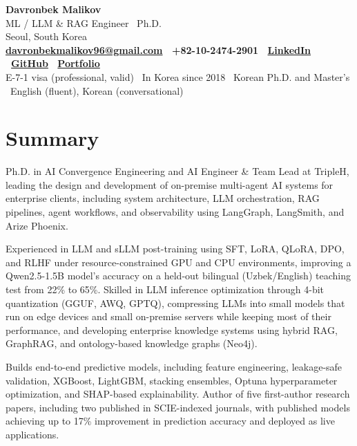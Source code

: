 \documentclass[10pt,a4paper]{article}
\newcommand{\name}[1]{{\Huge\bfseries #1}}
\begin{document}
\begin{center}
\name{Davronbek Malikov} \\[1.5mm]
ML / LLM \& RAG Engineer \textbar\ Ph.D. \\
Seoul, South Korea \\[0.5mm]
\textbf{
  \href{mailto:davronbekmalikov96@gmail.com}{davronbekmalikov96@gmail.com}
  \textbar\ +82-10-2474-2901
  \textbar\ \href{https://www.linkedin.com/in/davronbek-malikov}{LinkedIn}
  \textbar\ \href{https://github.com/davronbek-malikov}{GitHub}
  \textbar\ \href{https://davronbek-portfolio.vercel.app}{Portfolio}
} \\[0.5mm]
{\small E-7-1 visa (professional, valid) \textbar\ In Korea since 2018 \textbar\ Korean Ph.D. and Master's \textbar\ English (fluent), Korean (conversational)}
\end{center}

\section*{Summary}
Ph.D. in AI Convergence Engineering and AI Engineer \& Team Lead at TripleH, leading the design and development of
on-premise multi-agent AI systems for enterprise clients, including system architecture, LLM orchestration, RAG
pipelines, agent workflows, and observability using LangGraph, LangSmith, and Arize Phoenix.

\smallskip
Experienced in LLM and sLLM post-training using SFT, LoRA, QLoRA, DPO, and RLHF under resource-constrained GPU and CPU
environments, improving a Qwen2.5-1.5B model's accuracy on a held-out bilingual (Uzbek/English) teaching test from 22\%
to 65\%. Skilled in LLM inference optimization
through 4-bit quantization (GGUF, AWQ, GPTQ), compressing LLMs into small models that run on edge devices and small
on-premise servers while keeping most of their performance, and
developing enterprise knowledge systems using hybrid RAG, GraphRAG, and ontology-based knowledge graphs (Neo4j).

\smallskip
Builds end-to-end predictive models, including feature engineering, leakage-safe validation, XGBoost, LightGBM, stacking
ensembles, Optuna hyperparameter optimization, and SHAP-based explainability. Author of five first-author research
papers, including two published in SCIE-indexed journals, with published models achieving up to 17\% improvement in
prediction accuracy and deployed as live applications.
\end{document}
